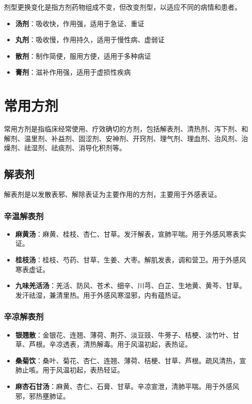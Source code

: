 \documentclass[12pt,UTF8]{ctexbook}
\begin{document}
剂型更换变化是指方剂药物组成不变，但改变剂型，以适应不同的病情和患者。

\begin{itemize}
\item \textbf{汤剂}：吸收快，作用强，适用于急证、重证
\item \textbf{丸剂}：吸收慢，作用持久，适用于慢性病、虚弱证
\item \textbf{散剂}：制作简便，服用方便，适用于多种病证
\item \textbf{膏剂}：滋补作用强，适用于虚损性疾病
\end{itemize}

\section{常用方剂}

常用方剂是指临床经常使用、疗效确切的方剂，包括解表剂、清热剂、泻下剂、和解剂、温里剂、补益剂、固涩剂、安神剂、开窍剂、理气剂、理血剂、治风剂、治燥剂、祛湿剂、祛痰剂、消导化积剂等。

\subsection{解表剂}

解表剂是以发散表邪、解除表证为主要作用的方剂，主要用于外感表证。

\subsubsection{辛温解表剂}

\begin{itemize}
\item \textbf{麻黄汤}：麻黄、桂枝、杏仁、甘草。发汗解表，宣肺平喘。用于外感风寒表实证。
\item \textbf{桂枝汤}：桂枝、芍药、甘草、生姜、大枣。解肌发表，调和营卫。用于外感风寒表虚证。
\item \textbf{九味羌活汤}：羌活、防风、苍术、细辛、川芎、白芷、生地黄、黄芩、甘草。发汗祛湿，兼清里热。用于外感风寒湿邪，内有蕴热证。
\end{itemize}

\subsubsection{辛凉解表剂}

\begin{itemize}
\item \textbf{银翘散}：金银花、连翘、薄荷、荆芥、淡豆豉、牛蒡子、桔梗、淡竹叶、甘草、芦根。辛凉透表，清热解毒。用于风温初起，表热证。
\item \textbf{桑菊饮}：桑叶、菊花、杏仁、连翘、薄荷、桔梗、甘草、芦根。疏风清热，宣肺止咳。用于风温初起，表热轻证。
\item \textbf{麻杏石甘汤}：麻黄、杏仁、石膏、甘草。辛凉宣泄，清肺平喘。用于外感风邪，邪热壅肺证。
\end{itemize}
\end{document}
